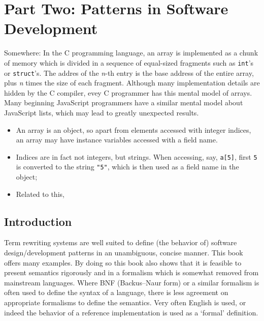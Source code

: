 \documentclass[11pt,twoside]{memoir}
\def\I{\textit} %
\def\T{\texttt}
\begin{document}
\part*{Part Two: Patterns in Software Development}
\label{part:pisd}


Somewhere: In the C programming language, an array is implemented as a chunk of memory which is divided in a sequence of equal-sized fragments such as \T{int}'s or \T{struct}'s. The addres of the \I{n}-th entry is the base address of the entire array, plus \I{n} times the size of each fragment. Although many implementation details are hidden by the C compiler, evey C programmer has this mental model of arrays. Many beginning JavaScript programmers have a similar mental model about JavaScript lists, which may lead to greatly unexpected results.


\begin{itemize}
	\item An array is an object, so apart from elements accessed with integer indices, an array may have instance variables accessed with a field name.
	\item Indices are in fact not integers, but strings. When accessing, say, \T{a[5]}, first \T{5} is converted to the string \T{"5"}, which is then used as a field name in the object;
	\item Related to this, 
\end{itemize}

\chapter*{Introduction}
Term rewriting systems are well suited to define (the behavior of) software design/development patterns in an unambiguous, concise manner. This book offers many examples. By doing so this book also shows that it is feasible to present semantics rigorously and in a formalism which is somewhat removed from mainstream languages. Where BNF (Backus–Naur form) or a similar formalism is often used to define the syntax of a language, there is less agreement on appropriate formalisms to define the semantics. Very often English is used, or indeed the behavior of a reference implementation is used as a `formal' definition.
\end{document}
